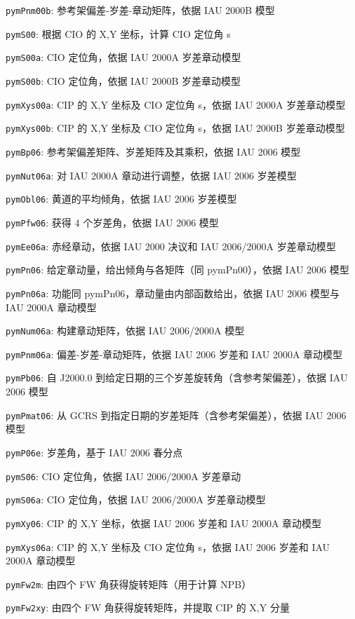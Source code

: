 \documentclass[11pt]{article}
\begin{document}
\texttt{pymPnm00b}: 参考架偏差-岁差-章动矩阵，依据 IAU 2000B 模型

\texttt{pymS00}: 根据 CIO 的 X,Y 坐标，计算 CIO 定位角 s

\texttt{pymS00a}: CIO 定位角，依据 IAU 2000A 岁差章动模型

\texttt{pymS00b}: CIO 定位角，依据 IAU 2000B 岁差章动模型

\texttt{pymXys00a}: CIP 的 X,Y 坐标及 CIO 定位角 s，依据 IAU 2000A 岁差章动模型

\texttt{pymXys00b}: CIP 的 X,Y 坐标及 CIO 定位角 s，依据 IAU 2000B 岁差章动模型

\texttt{pymBp06}: 参考架偏差矩阵、岁差矩阵及其乘积，依据 IAU 2006 模型

\texttt{pymNut06a}: 对 IAU 2000A 章动进行调整，依据 IAU 2006 岁差模型

\texttt{pymObl06}: 黄道的平均倾角，依据 IAU 2006 岁差模型

\texttt{pymPfw06}: 获得 4 个岁差角，依据 IAU 2006 模型

\texttt{pymEe06a}: 赤经章动，依据 IAU 2000 决议和 IAU 2006/2000A 岁差章动模型

\texttt{pymPn06}: 给定章动量，给出倾角与各矩阵（同 pymPn00），依据 IAU 2006 模型

\texttt{pymPn06a}: 功能同 pymPn06，章动量由内部函数给出，依据 IAU 2006 模型与 IAU 2000A 章动模型

\texttt{pymNum06a}: 构建章动矩阵，依据 IAU 2006/2000A 模型

\texttt{pymPnm06a}: 偏差-岁差-章动矩阵，依据 IAU 2006 岁差和 IAU 2000A 章动模型

\texttt{pymPb06}: 自 J2000.0 到给定日期的三个岁差旋转角（含参考架偏差），依据 IAU 2006 模型

\texttt{pymPmat06}: 从 GCRS 到指定日期的岁差矩阵（含参考架偏差），依据 IAU 2006 模型

\texttt{pymP06e}: 岁差角，基于 IAU 2006 春分点

\texttt{pymS06}: CIO 定位角，依据 IAU 2006/2000A 岁差章动

\texttt{pymS06a}: CIO 定位角，依据 IAU 2006/2000A 岁差章动模型

\texttt{pymXy06}: CIP 的 X,Y 坐标，依据 IAU 2006 岁差和 IAU 2000A 章动模型

\texttt{pymXys06a}: CIP 的 X,Y 坐标及 CIO 定位角 s，依据 IAU 2006 岁差和 IAU 2000A 章动模型

\texttt{pymFw2m}: 由四个 FW 角获得旋转矩阵（用于计算 NPB）

\texttt{pymFw2xy}: 由四个 FW 角获得旋转矩阵，并提取 CIP 的 X,Y 分量
\end{document}

